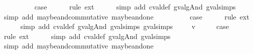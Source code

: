 \begin{isabellebody}
\isamarkupfalse%
\isanewline
\ \ \isamarkupfalse%
\ {\isachardoublequoteopen}{}{\isacharunderscore}{}{\isachardoublequoteclose}\isanewline
\ \ \isamarkupfalse%
\ \isamarkupfalse%
\ {\isacharquery}case\isanewline
\ \ \ \ \isamarkupfalse%
\ {\isacharparenleft}rule\ ext{\isacharparenright}{\isacharplus}\isanewline
\ \ \ \ \isamarkupfalse%
\ {\isacharparenleft}simp\ add{\isacharcolon}\ cval{\isacharunderscore}def\ gval{\isacharunderscore}gAnd\ gval{\isachardot}simps{\isacharparenleft}{}{\isacharparenright}{\isacharparenright}\isanewline
\ \ \ \ \isamarkupfalse%
\ {\isacharparenleft}simp\ add{\isacharcolon}\ maybe{\isacharunderscore}and{\isacharunderscore}commutative\ maybe{\isacharunderscore}and{\isacharunderscore}one{\isacharparenright}\isanewline
{}\isamarkupfalse%
\isanewline
\ \ \isamarkupfalse%
\ {\isachardoublequoteopen}{}{\isacharunderscore}{}{\isachardoublequoteclose}\isanewline
\ \ \isamarkupfalse%
\ \isamarkupfalse%
\ {\isacharquery}case\isanewline
\ \ \ \ \isamarkupfalse%
\ {\isacharparenleft}rule\ ext{\isacharparenright}{\isacharplus}\isanewline
\ \ \ \ \isamarkupfalse%
\ {\isacharparenleft}simp\ add{\isacharcolon}\ cval{\isacharunderscore}def\ gval{\isacharunderscore}gAnd\ gval{\isachardot}simps{\isacharparenleft}{}{\isacharparenright}\ gval{\isachardot}simps{\isacharparenleft}{}{\isacharparenright}{\isacharparenright}\isanewline
{}\isamarkupfalse%
\isanewline
\ \ \isamarkupfalse%
\ {\isacharparenleft}{\isachardoublequoteopen}{}{\isacharunderscore}{}{\isachardoublequoteclose}\ v{\isacharparenright}\isanewline
\ \ \isamarkupfalse%
\ \isamarkupfalse%
\ {\isacharquery}case\isanewline
\ \ \ \ \isamarkupfalse%
\ {\isacharparenleft}rule\ ext{\isacharparenright}{\isacharplus}\isanewline
\ \ \ \ \isamarkupfalse%
\ {\isacharparenleft}simp\ add{\isacharcolon}\ cval{\isacharunderscore}def\ gval{\isacharunderscore}gAnd\ gval{\isachardot}simps{\isacharparenleft}{}{\isacharparenright}{\isacharparenright}\isanewline
\ \ \ \ \isamarkupfalse%
\ {\isacharparenleft}simp\ add{\isacharcolon}\ maybe{\isacharunderscore}and{\isacharunderscore}commutative\ maybe{\isacharunderscore}and{\isacharunderscore}one{\isacharparenright}\isanewline

\end{isabellebody}
